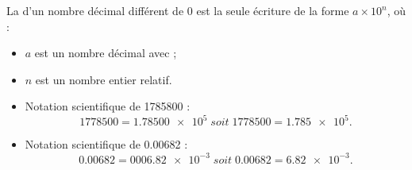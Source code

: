 \documentclass[12pt,a4paper]{article}
\begin{document}
\begin{mybilan}
		La  d'un nombre décimal différent de $0$ est la seule écriture de la forme $a \times 10^n$, où :
		
		\begin{itemize}
			\item $a$ est un nombre décimal avec ;
			\item $n$ est un nombre entier relatif.
		\end{itemize}
\end{mybilan}

\begin{myexs}
	\begin{itemize}
		\item Notation scientifique de \num{1785800} :
			\begin{equation*}
				\num{1778500} =  \num{1.78500e5}\;  soit \; \num{1778500} = \num{1.785e5}.
			\end{equation*}		
		
		\item Notation scientifique de \num{0.00682} :
			\begin{equation*}
				\num{0.00682} = \num{0006.82e-3} \;  soit \; \num{0.00682} =  \num{6.82e-3}.
			\end{equation*}
	\end{itemize}
		
\end{myexs}
\end{document}
